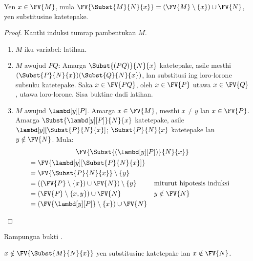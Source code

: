 \documentclass[../../../include/open-logic-section]{subfiles}
\begin{document}
\begin{thm} 
  Yen $x \in \FV{M}$, mula
  $\FV{\Subst{M}{N}{x}} = (\FV{M} \setminus
  \{x\}) \cup \FV{N}$, yen substitusine
  katetepake.
\end{thm}

\begin{proof}
  Kanthi induksi tumrap pambentukan $M$.
  \begin{enumerate}
  \item $M$ iku variabel: latihan.
  \item $M$ awujud $PQ$: Amarga
    $\Subst{(PQ)}{N}{x}$ katetepake,
    asile mesthi
    $(\Subst{P}{N}{x})(\Subst{Q}{N}{x})$,
    lan substitusi ing loro-lorone
    subsuku katetepake. Saka
    $x \in \FV{PQ}$, oleh
    $x \in \FV{P}$ utawa
    $x \in \FV{Q}$, utawa loro-lorone.
    Sisa buktine dadi latihan.
  \item $M$ awujud $\lambd[y][P]$.
    Amarga $x \in \FV{M}$,
    mesthi $x \neq y$ lan
    $x \in \FV{P}$.
    Amarga
    $\Subst{\lambd[y][P]}{N}{x}$
    katetepake, asile
    $\lambd[y][\Subst{P}{N}{x}]$;
    $\Subst{P}{N}{x}$ katetepake
    lan $y \notin \FV{N}$.
    Mula:
    \begin{multline*}
      \FV{\Subst{(\lambd[y][P])}{N}{x}} \\
      \begin{aligned}
      & = \FV{\lambd[y][\Subst{P}{N}{x}]} \\
      & = \FV{\Subst{P}{N}{x}} \setminus \{y\} \\
      & = ((\FV{P} \setminus \{x\}) \cup \FV{N}) \setminus \{y\}
       && \text{miturut hipotesis induksi} \\
      & = (\FV{P} \setminus \{x, y\}) \cup \FV{N}
       && y \notin \FV{N} \\
      & = (\FV{\lambd[y][P]} \setminus \{x\}) \cup \FV{N}
      \end{aligned}
      \end{multline*}
  \end{enumerate}
\end{proof}

\begin{prob}
  Rampungna bukti .
\end{prob}

\begin{thm}
  $x \notin \FV{\Subst{M}{N}{x}}$
  yen substitusine katetepake
  lan $x \notin \FV{N}$.
\end{thm}
\end{document}
